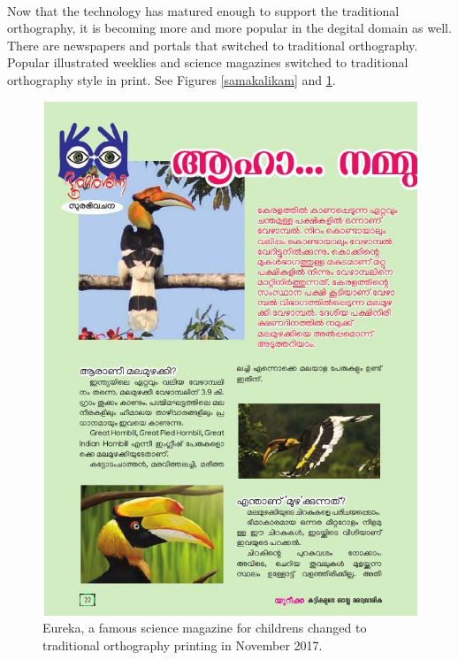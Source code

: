 \documentclass[10pt]{article}
\begin{document}
\paragraph{}
Now that the technology has matured enough to support the traditional orthography, it is becoming more and more popular in the degital domain as well. There are newspapers and portals that switched to traditional orthography. Popular illustrated weeklies and science magazines switched to traditional orthography style in print. See Figures \ref{samakalikam} and \ref{eureka}.
\begin{figure}[H]
	\centering
	\includegraphics[scale=0.3]{images/2017-Eureka.jpg}
	\caption{Eureka, a famous science magazine for childrens changed to traditional orthography printing in November 2017.}
	\label{eureka}
\end{figure}
\end{document}
